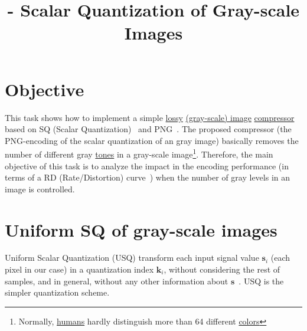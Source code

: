 

\title{\SM{} - Scalar Quantization of Gray-scale Images}

\maketitle
\tableofcontents

\section{Objective}
This task shows how to implement a simple
\href{https://en.wikipedia.org/wiki/Lossy_compression}{lossy}
\href{https://en.wikipedia.org/wiki/Grayscale}{(gray-scale) image}
\href{https://en.wikipedia.org/wiki/Image_compression}{compressor}~\cite{vruiz__image_IO}
based on SQ (Scalar
Quantization)~\cite{vruiz__scalar_quantization,sayood2017introduction,vetterli2014foundations}
and PNG~\cite{vruiz__PNG}. The proposed compressor (the PNG-encoding
of the scalar quantization of an gray image) basically removes the
number of different gray
\href{https://en.wikipedia.org/w/index.php?title=Tone_(color)&redirect=no}{tones}
in a gray-scale image\footnote{Normally,
\href{https://en.wikipedia.org/wiki/Visual_system}{humans} hardly
distinguish more than 64 different
\href{https://en.wikipedia.org/wiki/Color}{colors}}. Therefore, the
main objective of this task is to analyze the impact in the encoding
performance (in terms of a RD (Rate/Distortion)
curve~\cite{vruiz__information_theory}) when the number of gray levels
in an image is controlled.

\section{Uniform SQ of gray-scale images}
Uniform Scalar Quantization (USQ) transform each input signal value
$\mathbf{s}_i$ (each pixel in our case) in a quantization index
$\mathbf{k}_i$, without considering the rest of samples, and in
general, without any other information about
$\mathbf{s}$~\cite{vruiz__scalar_quantization}. USQ is the simpler
quantization scheme.

